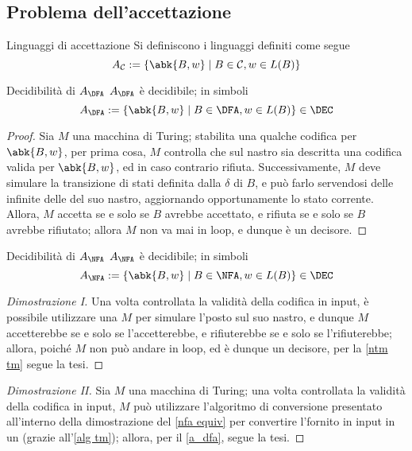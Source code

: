 \documentclass[a4paper, 12pt]{report}
\begin{document}
    \subsection{Problema dell'accettazione}

    \begin{frameddefn}{Linguaggi di accettazione}
        Si definiscono  i linguaggi definiti come segue $$A_\mathcal{C} := \{\abk{B, w} \mid B \in \mathcal{C} , w \in L(B)\}$$
    \end{frameddefn}

    \begin{framedthm}[label={a_dfa}]{Decidibilità di $A_\DFA$}
        $A_\DFA$ è decidibile; in simboli $$A_\DFA := \{\abk{B, w} \mid B \in \DFA, w \in L(B)\} \in \DEC$$
    \end{framedthm}

    \begin{proof}
        Sia $M$ una macchina di Turing; stabilita una qualche codifica per $\abk{B, w}$, per prima cosa, $M$ controlla che sul nastro sia descritta una codifica valida per $\abk{B,w}$, ed in caso contrario rifiuta. Successivamente, $M$ deve simulare la transizione di stati definita dalla $\delta$ di $B$, e può farlo servendosi delle infinite delle del suo nastro, aggiornando opportunamente lo stato corrente. Allora, $M$ accetta se e solo se $B$ avrebbe accettato, e rifiuta se e solo se $B$ avrebbe rifiutato; allora $M$ non va mai in loop, e dunque è un decisore.
    \end{proof}

    \begin{framedthm}[label={a_nfa}]{Decidibilità di $A_\NFA$}
        $A_\NFA$ è decidibile; in simboli $$A_\NFA := \{\abk{B, w} \mid B \in \NFA, w \in L(B)\} \in \DEC$$
    \end{framedthm}

    \begin{proof}[Dimostrazione I]
        Una volta controllata la validità della codifica in input, è possibile utilizzare una \NTM $M$ per simulare l'\NFA posto sul suo nastro, e dunque $M$ accetterebbe se e solo se l'\NFA accetterebbe, e rifiuterebbe se e solo se l'\NFA rifiuterebbe; allora, poiché $M$ non può andare in loop, ed è dunque un decisore, per la \cref{ntm tm} segue la tesi.
    \end{proof}

    \begin{proof}[Dimostrazione II]
        Sia $M$ una macchina di Turing; una volta controllata la validità della codifica in input, $M$ può utilizzare l'algoritmo di conversione presentato all'interno della dimostrazione del \cref{nfa equiv} per convertire l'\NFA fornito in input in un \DFA(grazie all'\cref{alg tm}); allora, per il \cref{a_dfa}, segue la tesi.
    \end{proof}
\end{document}
